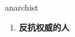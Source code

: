 
\begin{frame}
{\huge anarchist}
\begin{center}
\begin{enumerate}\Large
  \item \textbf{反抗权威的人}
\end{enumerate}
\end{center}
\end{frame}

